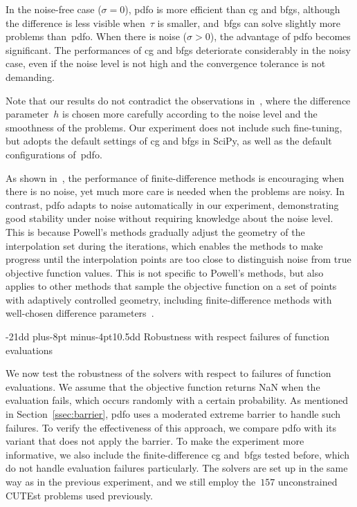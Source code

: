 \documentclass[
    smallextended,  %
    final,          %
]{svjour3}
\makeatletter
\def\subsection{\@startsection{subsection}{2}{\z@}%
    {-21dd plus-8pt minus-4pt}{10.5dd}
     {\normalsize\bfseries}}
\makeatother
\begin{document}
In the noise-free case ($\sigma = 0$), \gls{pdfo} is more efficient than
\gls{cg} and \gls{bfgs}, although the difference is less visible when~$\tau$ is
smaller, and~\gls{bfgs} can solve slightly more problems than~\gls{pdfo}.
When there is noise ($\sigma >0$), the advantage of \gls{pdfo} becomes significant.
The performances of \gls{cg} and \gls{bfgs} deteriorate considerably in the noisy case, even if the
noise level is not high and the convergence tolerance is not demanding.

Note that our results do not contradict the observations in~\cite{Shi_Etal_2022a,Shi_Etal_2022}, where the
difference parameter~$h$ is chosen more carefully according to the noise level and the smoothness of
the problems.
Our experiment does not include such fine-tuning, but adopts the default settings of \gls{cg} and
\gls{bfgs} in SciPy, as well as the default configurations of~\gls{pdfo}.

As shown in~\cite[\S~2]{Shi_Etal_2022}, the performance of finite-difference methods is encouraging when there is no noise, yet much more care is needed when the problems are noisy.
In contrast, \gls{pdfo} adapts to noise automatically in our experiment, demonstrating good stability under noise
without requiring knowledge about the noise level. This is because Powell's methods gradually adjust
the geometry of the interpolation set during the iterations, which
enables the methods to make progress until the interpolation points are too close to distinguish
noise from true objective function values.
This is not specific to Powell's methods,
but also applies to other methods that sample the objective function on a set of points with
adaptively controlled geometry, including finite-difference methods with well-chosen difference
parameters~\cite{Shi_Etal_2022a}.


\subsection{Robustness with respect failures of function evaluations}
\label{ssec:nan}

We now test the robustness of the solvers with respect to failures of function evaluations.
We assume that the objective function returns NaN when the evaluation fails, which occurs randomly
with a certain probability. As mentioned in Section~\ref{ssec:barrier}, \gls{pdfo} uses a moderated extreme
barrier to handle such failures. To verify the effectiveness of this approach, we compare \gls{pdfo}
with its variant that does not apply the barrier. To make the experiment more informative, we
also include the finite-difference \gls{cg} and~\gls{bfgs} tested before, which do not
handle evaluation failures particularly. The solvers are set up in the same way as in the
previous experiment, and we still employ the~$157$ unconstrained CUTEst problems used previously.
\end{document}
